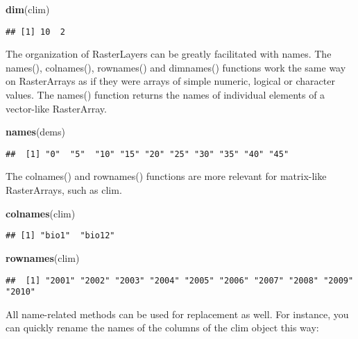 \documentclass[]{article}
\newenvironment{Shaded}{\begin{snugshade}}{\end{snugshade}}
\newcommand{\KeywordTok}[1]{\textcolor[rgb]{0.13,0.29,0.53}{\textbf{#1}}}
\newcommand{\NormalTok}[1]{#1}
\begin{document}
\begin{Shaded}
\begin{Highlighting}[]
\KeywordTok{dim}\NormalTok{(clim)}
\end{Highlighting}
\end{Shaded}

\begin{verbatim}
## [1] 10  2
\end{verbatim}

The organization of RasterLayers can be greatly facilitated with names.
The names(), colnames(), rownames() and dimnames() functions work the
same way on RasterArrays as if they were arrays of simple numeric,
logical or character values. The names() function returns the names of
individual elements of a vector-like RasterArray.

\begin{Shaded}
\begin{Highlighting}[]
\KeywordTok{names}\NormalTok{(dems)}
\end{Highlighting}
\end{Shaded}

\begin{verbatim}
##  [1] "0"  "5"  "10" "15" "20" "25" "30" "35" "40" "45"
\end{verbatim}

The colnames() and rownames() functions are more relevant for
matrix-like RasterArrays, such as clim.

\begin{Shaded}
\begin{Highlighting}[]
\KeywordTok{colnames}\NormalTok{(clim)}
\end{Highlighting}
\end{Shaded}

\begin{verbatim}
## [1] "bio1"  "bio12"
\end{verbatim}

\begin{Shaded}
\begin{Highlighting}[]
\KeywordTok{rownames}\NormalTok{(clim)}
\end{Highlighting}
\end{Shaded}

\begin{verbatim}
##  [1] "2001" "2002" "2003" "2004" "2005" "2006" "2007" "2008" "2009" "2010"
\end{verbatim}

All name-related methods can be used for replacement as well. For
instance, you can quickly rename the names of the columns of the clim
object this way:
\end{document}
